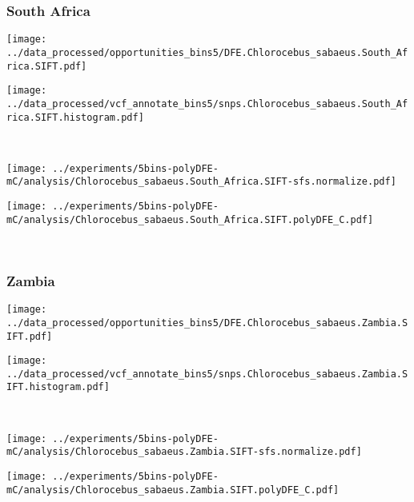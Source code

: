 \subsubsection{South Africa}

\begin{minipage}{0.49\linewidth}
    \texttt{[image: ../data\_processed/opportunities\_bins5/DFE.Chlorocebus\_sabaeus.South\_Africa.SIFT.pdf]}
\end{minipage}
\begin{minipage}{0.49\linewidth}
    \texttt{[image: ../data\_processed/vcf\_annotate\_bins5/snps.Chlorocebus\_sabaeus.South\_Africa.SIFT.histogram.pdf]}
\end{minipage}
\\
\begin{minipage}{0.49\linewidth}
    \texttt{[image: ../experiments/5bins-polyDFE-mC/analysis/Chlorocebus\_sabaeus.South\_Africa.SIFT-sfs.normalize.pdf]}
\end{minipage}
\begin{minipage}{0.49\linewidth}
    \texttt{[image: ../experiments/5bins-polyDFE-mC/analysis/Chlorocebus\_sabaeus.South\_Africa.SIFT.polyDFE\_C.pdf]}
\end{minipage}
\\

\subsubsection{Zambia}

\begin{minipage}{0.49\linewidth}
    \texttt{[image: ../data\_processed/opportunities\_bins5/DFE.Chlorocebus\_sabaeus.Zambia.SIFT.pdf]}
\end{minipage}
\begin{minipage}{0.49\linewidth}
    \texttt{[image: ../data\_processed/vcf\_annotate\_bins5/snps.Chlorocebus\_sabaeus.Zambia.SIFT.histogram.pdf]}
\end{minipage}
\\
\begin{minipage}{0.49\linewidth}
    \texttt{[image: ../experiments/5bins-polyDFE-mC/analysis/Chlorocebus\_sabaeus.Zambia.SIFT-sfs.normalize.pdf]}
\end{minipage}
\begin{minipage}{0.49\linewidth}
    \texttt{[image: ../experiments/5bins-polyDFE-mC/analysis/Chlorocebus\_sabaeus.Zambia.SIFT.polyDFE\_C.pdf]}
\end{minipage}
\\


